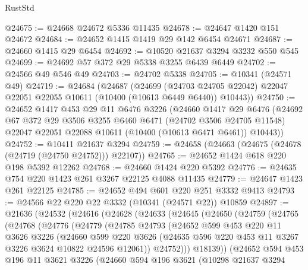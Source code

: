 \begin{lexlean}{RustStd}
\begin{coremodule}
{\begin{coremodule}
{{{{{{{{{{{{{{{{{{{{{{{{{@24675 := @24668 @24672 @5336 @11435
@24678 := @24647 @1420 @151 @24672
@24684 := @24652 @1415 @1419 @29 @142 @6454 @24671
@24687 := @24660 @1415 @29 @6454
@24692 := @10520 @21637 @3294 @3232 @550 @545
@24699 := @24692 @57 @372 @29 @5338 @3255 @6439 @6449
@24702 := @24566 @49 @546 @49
@24703 := @24702 @5338
@24705 := @10341 (@24571 @49)
@24719 := @24684
    (@24687
      (@24699
        (@24703 @24705 @22042)
        @22047
        @22051
        @22055
        @10611
        (@10400 (@10613 @6449 @6440))
        @10443))
@24750 := @24652
    @1417
    @453
    @29
    @11
    @6476
    @3226
    (@24660
      @1417
      @29
      @6476
      (@24692
        @67
        @372
        @29
        @3506
        @3255
        @6460
        @6471
        (@24702 @3506 @24705 @11548)
        @22047
        @22051
        @22088
        @10611
        (@10400 (@10613 @6471 @6461))
        @10443))
@24752 := @10411 @21637 @3294
@24759 := @24658 (@24663 (@24675 (@24678 (@24719 (@24750 @24752))) @22107))
@24765 := @24652 @1424 @618 @220 @198 @5392 @12262
@24768 := @24660 @1424 @220 @5392
@24776 := @24635 @754 @220 @1423 @261 @3267 @22125 @4088 @11435
@24779 := @24647 @1423 @261 @22125
@24785 := @24652 @494 @601 @220 @251 @3332 @9413
@24793 := @24566 @22 @220 @22 @3332 (@10341 (@24571 @22)) @10859
@24897 := @21636
    (@24532
      (@24616
        (@24628
          (@24633
            (@24645
              (@24650
                (@24759
                  (@24765
                    (@24768
                      (@24776
                        (@24779
                          (@24785
                            @24793
                            (@24652
                              @599
                              @453
                              @220
                              @11
                              @3626
                              @3226
                              (@24660
                                @599
                                @220
                                @3626
                                (@24635 @596 @220 @453 @11 @3267 @3226 @3624 @10822 @24596 @12061))
                              @24752)))
                        @18139))
                    (@24652
                      @594
                      @453
                      @196
                      @11
                      @3621
                      @3226
                      (@24660
                        @594
                        @196
                        @3621
                        (@10298
                          @21637
                          @3294
}}}}}}}}}}}}}}}}}}}}}}}}}
\end{coremodule}}
\end{coremodule}
\end{lexlean}
